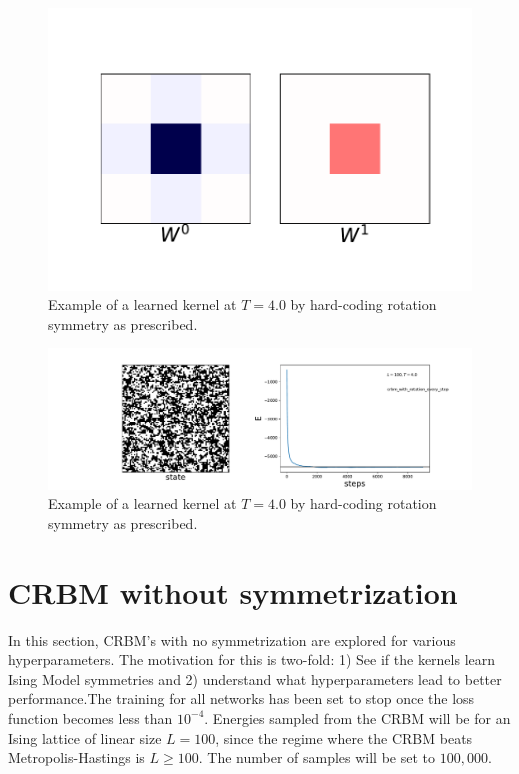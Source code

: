 \documentclass[12pt, two sided]{article}
\begin{document}
\begin{figure}[h!]
\includegraphics[width=\textwidth]{../figures/T_4.0_kernelDims_2-3_withRotations.pdf}
\caption{Example of a learned kernel at $T=4.0$ by hard-coding rotation symmetry as prescribed.}
\end{figure}

\begin{figure}[h!]
\includegraphics[width=\textwidth]{../figures/L_100_T_4.0_kernelSize_3_crbm_with_rotation_every_step.pdf}
\caption{Example of a learned kernel at $T=4.0$ by hard-coding rotation symmetry as prescribed.}
\end{figure}



\section{CRBM without symmetrization}

In this section, CRBM's with no symmetrization are explored for various hyperparameters. The motivation for this is two-fold: 1) See if the kernels learn Ising Model symmetries and 2) understand what hyperparameters lead to better performance.The training for all networks has been set to stop once the loss function becomes less than $10^{-4}$. Energies sampled from the CRBM will be for an Ising lattice of linear size $L=100$, since the regime where the CRBM beats Metropolis-Hastings is $L\geq100$. The number of samples will be set to $100,000$.
\end{document}
